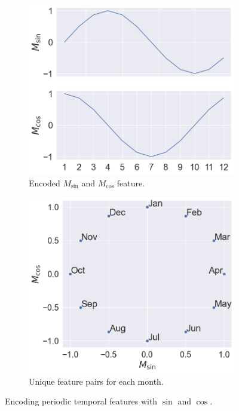 \documentclass{article}
\begin{document}
\begin{figure}[htbp]
     \centering
     \begin{subfigure}[b]{0.4\textwidth}
         \centering
         \includegraphics[width=\textwidth]{images/sine cosine.png}
         \caption{Encoded $M_{\sin}$ and $M_{\cos}$ feature.}
     \end{subfigure}
     \begin{subfigure}[b]{0.4\textwidth}
         \centering
         \includegraphics[width=\textwidth]{images/cyclic month.png}
         \caption{Unique feature pairs for each month.}
     \end{subfigure}
    \caption{Encoding periodic temporal features with $\sin$ and $\cos$.}
    \label{fig:monthfeat}
\end{figure}
\end{document}

